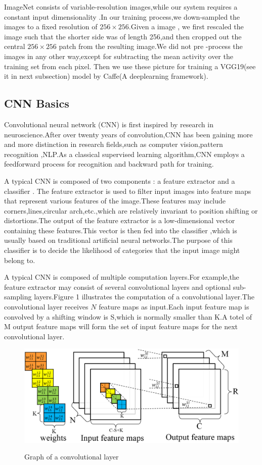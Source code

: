 \documentclass[10pt,a4paper]{ctexart}
\begin{document}
	ImageNet consists of variable-resolution images,while our system requires a constant input dimensionality .In our training process,we down-sampled the images to a fixed resolution of $256\times 256$.Given a image , we first rescaled 
	the image such that the shorter side was of length 256,and then cropped out the central $256\times 256$ patch from the resulting image.We did not pre
	-process the images in any other way,except for subtracting the mean activity over the training set from each pixel.
	Then we use these picture for 
	training a VGG19(see it in next subsection) model by Caffe\cite{jia2014caffe}(A deeplearning framework).
	
	\subsection{CNN Basics}
	Convolutional neural network (CNN) is first inspired by research in 
	neuroscience.After over twenty years of convolution,CNN has been gaining 
	more and more distinction in research fields,such as computer vision,pattern
	recognition ,NLP.As a classical supervised learning algorithm,CNN employs 
	a feedforward process for recognition and backward path for training.
	
	
	A typical CNN is composed of two components : a feature extractor and a classifier . The feature extractor is used to filter input images into 
	feature maps that represent various features of the image.These features may 
	include corners,lines,circular arch,etc.,which are relatively invariant to
	position shifting or distortions.The output of the feature extractor is a low-dimensional vector containing these features.This vector is then fed into the classifier ,which is usually based on traditional artificial neural 
	networks.The purpose of this classifier is to decide the likelihood of 
	categories that the input image might belong to.
	
	A typical CNN is composed of multiple computation layers.For example,the feature extractor may consist of several convolutional layers and 
	optional sub-sampling layers.Figure 1 illustrates the computation of a convolutional layer.The convolutional layer receives $N$ feature maps as input.Each input feature map is convolved by a shifting window is S,which 
	is normally smaller than K.A totel of M output feature maps will form the 
	set of input feature maps for the next convolutional layer.  
	
	\begin{figure}[h]
		\centering
		{\includegraphics[width=0.8\linewidth]{convolve.png}}
		\caption{Graph of a convolutional layer}
	\end{figure}
\end{document}
